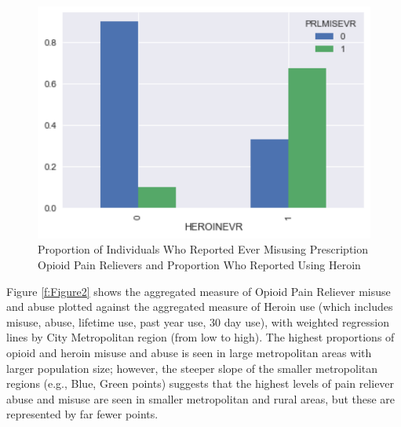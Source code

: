 \documentclass[sigconf]{acmart}
\begin{document}
\begin{figure}[!ht]
  \centering\includegraphics[width=\columnwidth]{images/Figure1.pdf}
  \caption{Proportion of Individuals Who Reported Ever Misusing Prescription
  Opioid Pain Relievers and Proportion Who Reported Using Heroin}
  \label{f:Figure1}
\end{figure}

Figure \ref{f:Figure2} shows the aggregated measure of Opioid Pain Reliever 
misuse and abuse plotted against the aggregated measure of Heroin use (which
includes misuse, abuse, lifetime use, past year use, 30 day use), with
weighted regression lines by City Metropolitan region (from low to high). 
The highest proportions of opioid and heroin misuse and abuse is seen in 
large metropolitan areas with larger population size; however, the steeper
slope of the smaller metropolitan regions (e.g., Blue, Green points)
suggests that the highest levels of pain reliever abuse and misuse are
seen in smaller metropolitan and rural areas, but these are represented
by far fewer points. 
\end{document}
